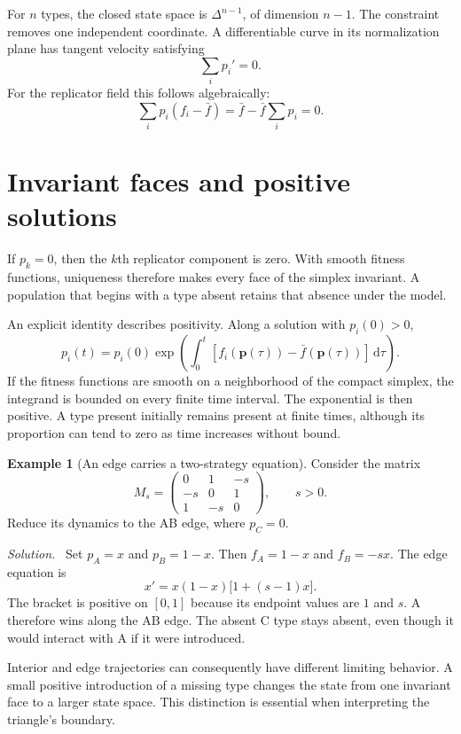 \documentclass[11pt,oneside,openany]{book}
\theoremstyle{definition}
\newtheorem{example}{Example}[chapter]
\theoremstyle{remark}
\newenvironment{solution}{\par\smallskip\noindent\textit{Solution.}\ }{\par\smallskip}
\newcommand{\dd}{\,\mathrm{d}}
\newcommand{\p}{\mathbf{p}}
\numberwithin{equation}{chapter}
\begin{document}
For $n$ types, the closed state space is $\Delta^{n-1}$, of dimension $n-1$. The constraint removes one independent coordinate. A differentiable curve in its normalization plane has tangent velocity satisfying
\begin{equation}\label{eq:tangent}
\sum_i p_i'=0.
\end{equation}
For the replicator field this follows algebraically:
\[
\sum_i p_i(f_i-\bar f)=\bar f-\bar f\sum_i p_i=0.
\]

\section{Invariant faces and positive solutions}
If $p_k=0$, then the $k$th replicator component is zero. With smooth fitness functions, uniqueness therefore makes every face of the simplex invariant. A population that begins with a type absent retains that absence under the model.

An explicit identity describes positivity. Along a solution with $p_i(0)>0$,
\begin{equation}\label{eq:positivity}
p_i(t)=p_i(0)\exp\left(\int_0^t[f_i(\p(\tau))-\bar f(\p(\tau))]\dd\tau\right).
\end{equation}
If the fitness functions are smooth on a neighborhood of the compact simplex, the integrand is bounded on every finite time interval. The exponential is then positive. A type present initially remains present at finite times, although its proportion can tend to zero as time increases without bound.

\begin{example}[An edge carries a two-strategy equation]
Consider the matrix
\[
M_s=\begin{pmatrix}0&1&-s\\-s&0&1\\1&-s&0\end{pmatrix},\qquad s>0.
\]
Reduce its dynamics to the AB edge, where $p_C=0$.
\begin{solution}
Set $p_A=x$ and $p_B=1-x$. Then $f_A=1-x$ and $f_B=-sx$. The edge equation is
\[
x'=x(1-x)\bigl[1+(s-1)x\bigr].
\]
The bracket is positive on $[0,1]$ because its endpoint values are $1$ and $s$. A therefore wins along the AB edge. The absent C type stays absent, even though it would interact with A if it were introduced.
\end{solution}
\end{example}

Interior and edge trajectories can consequently have different limiting behavior. A small positive introduction of a missing type changes the state from one invariant face to a larger state space. This distinction is essential when interpreting the triangle's boundary.
\end{document}
